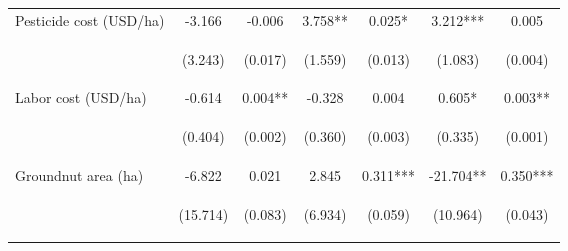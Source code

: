 \begin{center}
\begin{tabular}{lcccccc}
Pesticide cost (USD/ha) & -3.166 & -0.006 & 3.758** & 0.025* & 3.212*** & 0.005 \\
\vspace{4pt} & \begin{footnotesize}(3.243)\end{footnotesize} & \begin{footnotesize}(0.017)\end{footnotesize} & \begin{footnotesize}(1.559)\end{footnotesize} & \begin{footnotesize}(0.013)\end{footnotesize} & \begin{footnotesize}(1.083)\end{footnotesize} & \begin{footnotesize}(0.004)\end{footnotesize} \\
Labor cost (USD/ha) & -0.614 & 0.004** & -0.328 & 0.004 & 0.605* & 0.003** \\
\vspace{4pt} & \begin{footnotesize}(0.404)\end{footnotesize} & \begin{footnotesize}(0.002)\end{footnotesize} & \begin{footnotesize}(0.360)\end{footnotesize} & \begin{footnotesize}(0.003)\end{footnotesize} & \begin{footnotesize}(0.335)\end{footnotesize} & \begin{footnotesize}(0.001)\end{footnotesize} \\
Groundnut area (ha) & -6.822 & 0.021 & 2.845 & 0.311*** & -21.704** & 0.350*** \\
\vspace{4pt} & \begin{footnotesize}(15.714)\end{footnotesize} & \begin{footnotesize}(0.083)\end{footnotesize} & \begin{footnotesize}(6.934)\end{footnotesize} & \begin{footnotesize}(0.059)\end{footnotesize} & \begin{footnotesize}(10.964)\end{footnotesize} & \begin{footnotesize}(0.043)\end{footnotesize} \\

\end{tabular}
\end{center}
